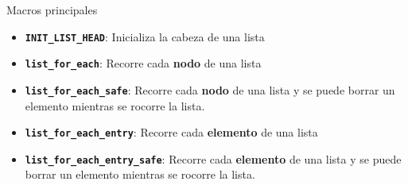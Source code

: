 \documentclass{mybeamer}
\begin{document}
\begin{framesubsec}[Macros]{Macros principales}
	\begin{itemize}
		\item \texttt{\bfseries INIT\_LIST\_HEAD}: Inicializa la cabeza
			de una lista
		\item \texttt{\bfseries list\_for\_each}: Recorre cada
			\textbf{nodo} de una lista
		\item \texttt{\bfseries list\_for\_each\_safe}: Recorre cada
			\textbf{nodo} de una lista y se puede borrar un
			elemento mientras se rocorre la lista.
		\item \texttt{\bfseries list\_for\_each\_entry}: Recorre cada
			\textbf{elemento} de una lista
		\item \texttt{\bfseries list\_for\_each\_entry\_safe}: Recorre cada
			\textbf{elemento} de una lista y se puede borrar un
			elemento mientras se rocorre la lista.
	\end{itemize}
\end{framesubsec}
\end{document}
